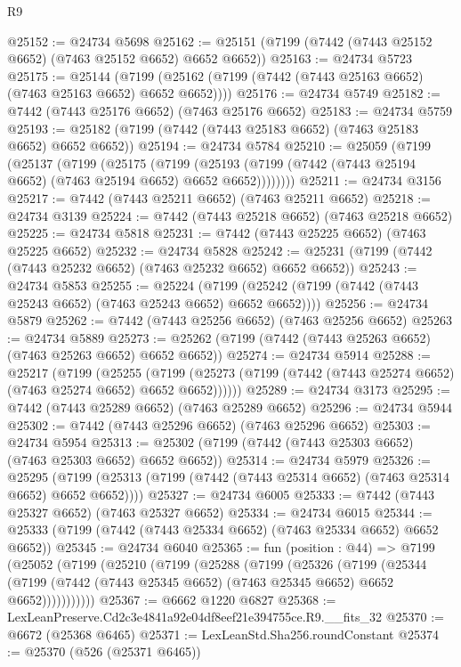 \begin{lexlean}{R9}
\begin{coremodule}
@25152 := @24734 @5698
@25162 := @25151 (@7199 (@7442 (@7443 @25152 @6652) (@7463 @25152 @6652) @6652 @6652))
@25163 := @24734 @5723
@25175 := @25144
    (@7199 (@25162 (@7199 (@7442 (@7443 @25163 @6652) (@7463 @25163 @6652) @6652 @6652))))
@25176 := @24734 @5749
@25182 := @7442 (@7443 @25176 @6652) (@7463 @25176 @6652)
@25183 := @24734 @5759
@25193 := @25182 (@7199 (@7442 (@7443 @25183 @6652) (@7463 @25183 @6652) @6652 @6652))
@25194 := @24734 @5784
@25210 := @25059
    (@7199
      (@25137
        (@7199
          (@25175
            (@7199
              (@25193 (@7199 (@7442 (@7443 @25194 @6652) (@7463 @25194 @6652) @6652 @6652))))))))
@25211 := @24734 @3156
@25217 := @7442 (@7443 @25211 @6652) (@7463 @25211 @6652)
@25218 := @24734 @3139
@25224 := @7442 (@7443 @25218 @6652) (@7463 @25218 @6652)
@25225 := @24734 @5818
@25231 := @7442 (@7443 @25225 @6652) (@7463 @25225 @6652)
@25232 := @24734 @5828
@25242 := @25231 (@7199 (@7442 (@7443 @25232 @6652) (@7463 @25232 @6652) @6652 @6652))
@25243 := @24734 @5853
@25255 := @25224
    (@7199 (@25242 (@7199 (@7442 (@7443 @25243 @6652) (@7463 @25243 @6652) @6652 @6652))))
@25256 := @24734 @5879
@25262 := @7442 (@7443 @25256 @6652) (@7463 @25256 @6652)
@25263 := @24734 @5889
@25273 := @25262 (@7199 (@7442 (@7443 @25263 @6652) (@7463 @25263 @6652) @6652 @6652))
@25274 := @24734 @5914
@25288 := @25217
    (@7199
      (@25255
        (@7199 (@25273 (@7199 (@7442 (@7443 @25274 @6652) (@7463 @25274 @6652) @6652 @6652))))))
@25289 := @24734 @3173
@25295 := @7442 (@7443 @25289 @6652) (@7463 @25289 @6652)
@25296 := @24734 @5944
@25302 := @7442 (@7443 @25296 @6652) (@7463 @25296 @6652)
@25303 := @24734 @5954
@25313 := @25302 (@7199 (@7442 (@7443 @25303 @6652) (@7463 @25303 @6652) @6652 @6652))
@25314 := @24734 @5979
@25326 := @25295
    (@7199 (@25313 (@7199 (@7442 (@7443 @25314 @6652) (@7463 @25314 @6652) @6652 @6652))))
@25327 := @24734 @6005
@25333 := @7442 (@7443 @25327 @6652) (@7463 @25327 @6652)
@25334 := @24734 @6015
@25344 := @25333 (@7199 (@7442 (@7443 @25334 @6652) (@7463 @25334 @6652) @6652 @6652))
@25345 := @24734 @6040
@25365 := fun (position : @44) =>
  @7199
    (@25052
      (@7199
        (@25210
          (@7199
            (@25288
              (@7199
                (@25326
                  (@7199
                    (@25344
                      (@7199 (@7442 (@7443 @25345 @6652) (@7463 @25345 @6652) @6652 @6652)))))))))))
@25367 := @6662 @1220 @6827
@25368 := LexLeanPreserve.Cd2c3e4841a92e04df8eef21e394755ce.R9.__fits_32
@25370 := @6672 (@25368 @6465)
@25371 := LexLeanStd.Sha256.roundConstant
@25374 := @25370 (@526 (@25371 @6465))

\end{coremodule}
\end{lexlean}
